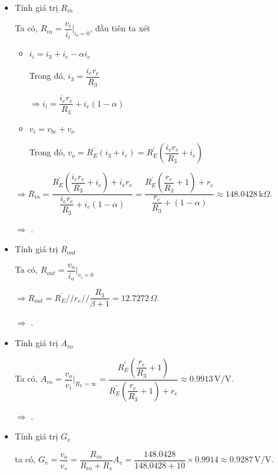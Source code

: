 \begin{itemize}[label=-]
	\item Tính giá trị $R_{in}$
	
	Ta có, $R_{in} = \dfrac{v_{i}}{i_{i}}|_{i_{o} = 0}$, đầu tiên ta xét
	
	\begin{itemize}[label=+, leftmargin=1cm]
		\item $i_{i} = i_{3} + i_{e} - \alpha i_{e} $
		
		Trong đó, $i_{3} = \dfrac{i_{e} r_{e}}{R_{3}}$
		
		$\Rightarrow i_{i} = \dfrac{i_{e} r_{e}}{R_{3}} + i_{e}(1-\alpha)$
		\item $v_{i} = v_{be} + v_{o}$
		
		Trong đó, $v_{o} = R_{E}^{'} (i_{3} + i_{e}) = R_{E}^{'} \left( \dfrac{i_{e} r_{e}}{R_{3}} + i_{e} \right)$
	\end{itemize}
	
	$\Rightarrow R_{in} = \dfrac{R_{E}^{'} \left( \dfrac{i_{e} r_{e}}{R_{3}} + i_{e} \right) + i_{e}r_{e}}{\dfrac{i_{e} r_{e}}{R_{3}} + i_{e}(1-\alpha)} = \dfrac{R_{E}^{'} \left( \dfrac{r_{e}}{R_{3}} + 1 \right) + r_{e}}{\dfrac{r_{e}}{R_{3}} + (1-\alpha)} \approx 148.0428 \,\text{k}\Omega$.
	
	$\Rightarrow$ .
	
	\item Tính giá trị $R_{out}$
	
	Ta có, $R_{out} = \dfrac{v_{o}}{i_{o}}|_{v_{i} = 0}$
	
	$\Rightarrow R_{out} = R_{E}^{'} // r_{e} // \dfrac{R_{3}}{\beta + 1} = 12.7272\,\Omega$.
	
	$\Rightarrow$ .
	
	\item Tính giá trị $A_{vo}$
	
	Ta có, $A_{vo} = \dfrac{v_{o}}{v_{i}}|_{R_{L} = \infty} = \dfrac{R_{E}^{'} \left( \dfrac{r_{e}}{R_{3}} + 1 \right)}{R_{E}^{'} \left( \dfrac{r_{e}}{R_{3}} + 1 \right) + r_{e}} \approx 0.9913 \,\text{V/V}$.
	
	$\Rightarrow$ .
	
	\item Tính giá trị $G_{v}$
	
	ta có, $G_{v} = \dfrac{v_{o}}{v_{s}} = \dfrac{R_{in}}{R_{in} + R_{s}} A_{v} = \dfrac{148.0428}{148.0428 + 10}\times 0.9914 \approx 0.9287 \,\text{V/V}$.
	

\end{itemize}
